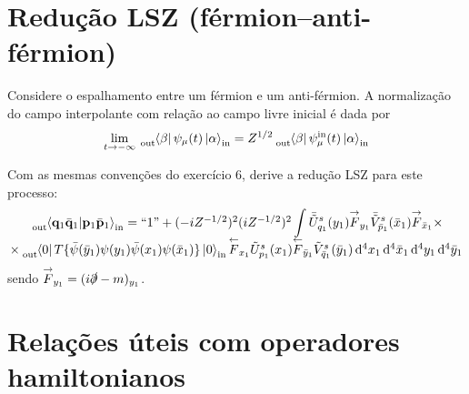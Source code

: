 \documentclass[a4paper, 11pt, oneside]{impression}
\begin{document}


\newpage

\chapter{Redução LSZ (férmion--anti-férmion)}\label{quest: nine}

\begin{exercise}{}
    Considere o espalhamento entre um férmion e um anti-férmion. A normalização do campo interpolante com relação ao campo livre inicial é dada por
        \begin{equation*}
            \lim_{t\to-\infty} \tensor[_{\text{out}}]{\bra{\beta}\psi_{\mu}(t)\ket{\alpha}}{_{\text{in}}} = Z^{1/2} \tensor[_{\text{out}}]{\bra{\beta}\psi_{\mu}^{\text{in}}(t)\ket{\alpha}}{_{\text{in}}}
        \end{equation*}

    \noindent Com as mesmas convenções do exercício 6, derive a redução LSZ para este processo:
        \begin{equation*}
            \begin{matrix}
            \tensor[_{\text{out}}]{\braket{\vb{q}_{1}\bar{\vb{q}}_{1}}{\vb{p}_{1}\bar{\vb{p}}_{1}}}{_{\text{in}}} = \text{``1''} + (-iZ^{-1/2})^2 (iZ^{-1/2})^2 \displaystyle\int 
            \bar{\tilde{U}}^{s}_{q_{1}}(y_{1}) 
            \overset{\rightarrow}{F}_{y_{1}} 
            \bar{\tilde{V}}^{s}_{\bar{p}_{1}}(\bar{x}_{1}) 
            \overset{\rightarrow}{F}_{\bar{x}_{1}} \times \\
            \times \tensor[_{\text{out}}]{\bra{0}T\{\bar{\psi}(\bar{y}_{1})\psi(y_{1})\bar{\psi}(x_{1})\psi(\bar{x}_{1})\}\ket{0}}{_{\text{in}}}
            \overset{\leftarrow}{F}_{x_{1}}
            \tilde{U}^{s}_{p_{1}}(x_{1})
            \overset{\leftarrow}{F}_{\bar{y}_{1}}
            \tilde{V}^{s}_{\bar{q}_{1}}(\bar{y}_{1})
            \dd[4]{x_{1}} \dd[4]{\bar{x}_{1}} \dd[4]{y_{1}} \dd[4]{\bar{y}_{1}}
        \end{matrix}
        \end{equation*}
    sendo $\overset{\rightarrow}{F}_{y_{1}} = (i\slashed{\partial} - m)_{y_{1}}$.
\end{exercise}



\newpage

\chapter{Relações úteis com operadores hamiltonianos}\label{quest: ten}
\end{document}
